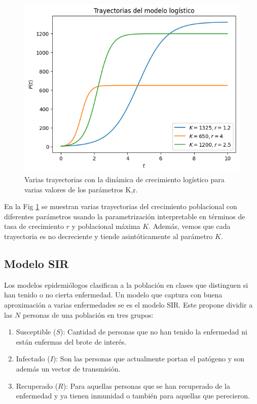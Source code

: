 \begin{figure}
    \centering
    \includegraphics[width = 10 cm]{img/trayectoria_log.png}
    \caption{Varias trayectorias con la dinámica de crecimiento logístico para varias valores de los parámetros K,r.}
    \label{fig:trayectoria_logistico}
\end{figure}

En la Fig \ref{fig:trayectoria_logistico} se muestran varias trayectorias del crecimiento poblacional con diferentes parámetros usando la parametrización interpretable en términos de tasa de crecimiento $r$ y poblacional máxima $K$. Además, vemos que cada trayectoria es no decreciente y tiende asintóticamente al parámetro $K$. 



\subsection{Modelo SIR}

Los modelos epidemiólogos clasifican a la población en clases que distinguen si han tenido o no cierta enfermedad. Un modelo que captura con buena aproximación a varias enfermedades se es el modelo SIR. Este propone dividir a las $N$ personas de una población en tres grupos:
\begin{enumerate}
    \item Susceptible ($S$): Cantidad de personas que no han tenido la enfermedad ni están enfermas del brote de interés.
    \item Infectado ($I$): Son las personas que actualmente portan el patógeno y son además un vector de transmisión.
    \item Recuperado ($R$): Para aquellas personas que se han recuperado de la enfermedad y ya tienen inmunidad o también para aquellas que perecieron.
\end{enumerate}

